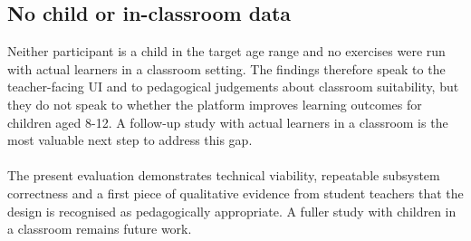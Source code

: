\subsection*{No child or in-classroom data} Neither participant is a child in the target age range and no exercises were run with actual learners in a classroom setting. 
The findings therefore speak to the teacher-facing UI and to pedagogical judgements about classroom suitability, but they do not speak to whether the platform improves learning 
outcomes for children aged 8-12. A follow-up study with actual learners in a classroom is the most valuable next step to address this gap. 
\\\\
The present evaluation demonstrates technical viability, repeatable subsystem correctness and a first piece of qualitative evidence from student teachers that the design 
is recognised as pedagogically appropriate. 
A fuller study with children in a classroom remains future work. 